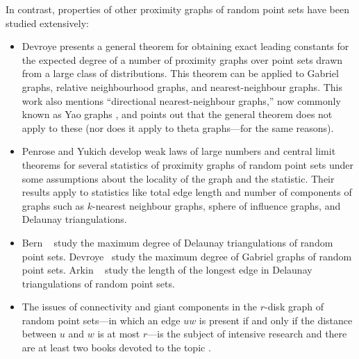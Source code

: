\documentclass{patmorin}
\begin{document}
In contrast, properties of other proximity graphs of random point
sets have been studied extensively:  
\begin{itemize}
\item Devroye \cite{devroye:expected}
presents a general theorem for obtaining exact leading constants for the
expected degree of a number of proximity graphs over point sets drawn
from a large class of distributions.  This theorem can be applied to
Gabriel graphs, relative neighbourhood graphs, and nearest-neighbour
graphs.  This work \cite[Section~7]{devroye:expected} also mentions
``directional nearest-neighbour graphs,'' now commonly known as Yao graphs
\cite{flinchbaugh.jones:strong,yao:on}, and points out that the general
theorem does not apply to these (nor does it apply to theta graphs---for
the same reasons).

\item 
Penrose and Yukich \cite{penrose.yukich:central,penrose.yukich:weak}
develop weak laws of large numbers and central limit theorems for several
statistics of proximity graphs of random point sets under some assumptions
about the locality of the graph and the statistic. Their results apply
to statistics like total edge length and number of components of graphs
such as $k$-nearest neighbour graphs, sphere of influence graphs,
and Delaunay triangulations.




\item 
Bern \etal\ \cite{bern.eppstein.ea:expected} study the maximum degree
of Delaunay triangulations of random point sets.  Devroye \etal\ study
the maximum degree of Gabriel graphs \cite{devroye.gudmundsson.ea:on}
of random point sets.  Arkin \etal\ \cite{arkin.anta.ea:probabilistic}
study the length of the longest edge in Delaunay triangulations of random
point sets.

\item 
The issues of connectivity and giant components in the $r$-disk graph
of random point sets---in which an edge $uw$ is present if and only
if the distance between $u$ and $w$ is at most $r$---is the subject of
intensive research and there are at least two books devoted to the topic
\cite{meester.roy:continuum,penrose:random}.
\end{itemize}
\end{document}
